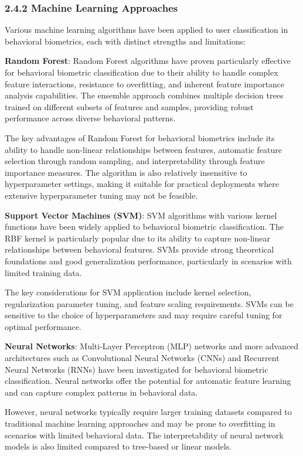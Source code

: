 \documentclass[
  11pt,
  a4paper,
]{article}
\begin{document}
\subsubsection{2.4.2 Machine Learning
Approaches}\label{machine-learning-approaches}

Various machine learning algorithms have been applied to user
classification in behavioral biometrics, each with distinct strengths
and limitations:

\textbf{Random Forest}: Random Forest algorithms have proven
particularly effective for behavioral biometric classification due to
their ability to handle complex feature interactions, resistance to
overfitting, and inherent feature importance analysis capabilities. The
ensemble approach combines multiple decision trees trained on different
subsets of features and samples, providing robust performance across
diverse behavioral patterns.

The key advantages of Random Forest for behavioral biometrics include
its ability to handle non-linear relationships between features,
automatic feature selection through random sampling, and
interpretability through feature importance measures. The algorithm is
also relatively insensitive to hyperparameter settings, making it
suitable for practical deployments where extensive hyperparameter tuning
may not be feasible.

\textbf{Support Vector Machines (SVM)}: SVM algorithms with various
kernel functions have been widely applied to behavioral biometric
classification. The RBF kernel is particularly popular due to its
ability to capture non-linear relationships between behavioral features.
SVMs provide strong theoretical foundations and good generalization
performance, particularly in scenarios with limited training data.

The key considerations for SVM application include kernel selection,
regularization parameter tuning, and feature scaling requirements. SVMs
can be sensitive to the choice of hyperparameters and may require
careful tuning for optimal performance.

\textbf{Neural Networks}: Multi-Layer Perceptron (MLP) networks and more
advanced architectures such as Convolutional Neural Networks (CNNs) and
Recurrent Neural Networks (RNNs) have been investigated for behavioral
biometric classification. Neural networks offer the potential for
automatic feature learning and can capture complex patterns in
behavioral data.

However, neural networks typically require larger training datasets
compared to traditional machine learning approaches and may be prone to
overfitting in scenarios with limited behavioral data. The
interpretability of neural network models is also limited compared to
tree-based or linear models.
\end{document}
